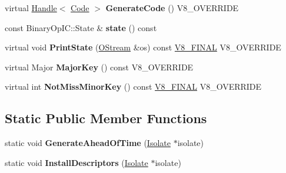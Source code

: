 \begin{DoxyCompactItemize}
\item 
\hypertarget{classv8_1_1internal_1_1_binary_op_i_c_stub_aeae316532939b888b8f550effdb2020e}{}virtual \hyperlink{classv8_1_1internal_1_1_handle}{Handle}$<$ \hyperlink{classv8_1_1internal_1_1_code}{Code} $>$ {\bfseries Generate\+Code} () V8\+\_\+\+O\+V\+E\+R\+R\+I\+D\+E\label{classv8_1_1internal_1_1_binary_op_i_c_stub_aeae316532939b888b8f550effdb2020e}

\item 
\hypertarget{classv8_1_1internal_1_1_binary_op_i_c_stub_a760d050edc3611237ea006b87ae38338}{}const Binary\+Op\+I\+C\+::\+State \& {\bfseries state} () const \label{classv8_1_1internal_1_1_binary_op_i_c_stub_a760d050edc3611237ea006b87ae38338}

\item 
\hypertarget{classv8_1_1internal_1_1_binary_op_i_c_stub_a5581011ea4868dc31ba38999c6d233e8}{}virtual void {\bfseries Print\+State} (\hyperlink{classv8_1_1internal_1_1_o_stream}{O\+Stream} \&os) const \hyperlink{classv8_1_1internal_1_1_v8___f_i_n_a_l}{V8\+\_\+\+F\+I\+N\+A\+L} V8\+\_\+\+O\+V\+E\+R\+R\+I\+D\+E\label{classv8_1_1internal_1_1_binary_op_i_c_stub_a5581011ea4868dc31ba38999c6d233e8}

\item 
\hypertarget{classv8_1_1internal_1_1_binary_op_i_c_stub_acf2d710f430c0a109c730957f920a9b2}{}virtual Major {\bfseries Major\+Key} () const V8\+\_\+\+O\+V\+E\+R\+R\+I\+D\+E\label{classv8_1_1internal_1_1_binary_op_i_c_stub_acf2d710f430c0a109c730957f920a9b2}

\item 
\hypertarget{classv8_1_1internal_1_1_binary_op_i_c_stub_aff638ce32679ee4b4f688e3a80a1af5a}{}virtual int {\bfseries Not\+Miss\+Minor\+Key} () const \hyperlink{classv8_1_1internal_1_1_v8___f_i_n_a_l}{V8\+\_\+\+F\+I\+N\+A\+L} V8\+\_\+\+O\+V\+E\+R\+R\+I\+D\+E\label{classv8_1_1internal_1_1_binary_op_i_c_stub_aff638ce32679ee4b4f688e3a80a1af5a}

\end{DoxyCompactItemize}
\subsection*{Static Public Member Functions}
\begin{DoxyCompactItemize}
\item 
\hypertarget{classv8_1_1internal_1_1_binary_op_i_c_stub_a827c2ea3029cb673819c7f633b357ac6}{}static void {\bfseries Generate\+Ahead\+Of\+Time} (\hyperlink{classv8_1_1internal_1_1_isolate}{Isolate} $\ast$isolate)\label{classv8_1_1internal_1_1_binary_op_i_c_stub_a827c2ea3029cb673819c7f633b357ac6}

\item 
\hypertarget{classv8_1_1internal_1_1_binary_op_i_c_stub_a2af38fe7b39d08a92c3dd5a69fdaa4ee}{}static void {\bfseries Install\+Descriptors} (\hyperlink{classv8_1_1internal_1_1_isolate}{Isolate} $\ast$isolate)\label{classv8_1_1internal_1_1_binary_op_i_c_stub_a2af38fe7b39d08a92c3dd5a69fdaa4ee}

\end{DoxyCompactItemize}

